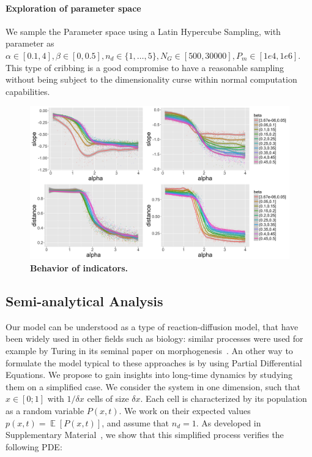 \documentclass[10pt,letterpaper,draft]{article}
\DeclareMathOperator{\E}{\mathbb{E}}
\newcommand{\Eb}[1]{\ensuremath{\E\!\left[#1\right]}}
\begin{document}
\paragraph{Exploration of parameter space}

We sample the Parameter space using a Latin Hypercube Sampling, with parameter as $\alpha \in [0.1,4],\beta \in [0,0.5],n_d \in \{1,\ldots , 5\}, N_G \in [500,30000], P_m \in [1e4,1e6]$. This type of cribbing is a good compromise to have a reasonable sampling without being subject to the dimensionality curse within normal computation capabilities. 




\begin{figure}
\includegraphics[width=\textwidth]{figures/Fig3.png}
\caption{\textbf{Behavior of indicators.}}
\label{fig:fig3}
\end{figure}






\subsection*{Semi-analytical Analysis}\label{subsec:analytical}

Our model can be understood as a type of reaction-diffusion model, that have been widely used in other fields such as biology: similar processes were used for example by Turing in its seminal paper on morphogenesis~\cite{turing1952chemical}. An other way to formulate the model typical to these approaches is by using Partial Differential Equations. We propose to gain insights into long-time dynamics by studying them on a simplified case. We consider the system in one dimension, such that $x\in \left[0;1\right]$ with $1/\delta x$ cells of size $\delta x$. Each cell is characterized by its population as a random variable $P(x,t)$. We work on their expected values $p(x,t) = \Eb{P(x,t)}$, and assume that $n_d=1$. As developed in Supplementary Material~, we show that this simplified process verifies the following PDE:
\end{document}
